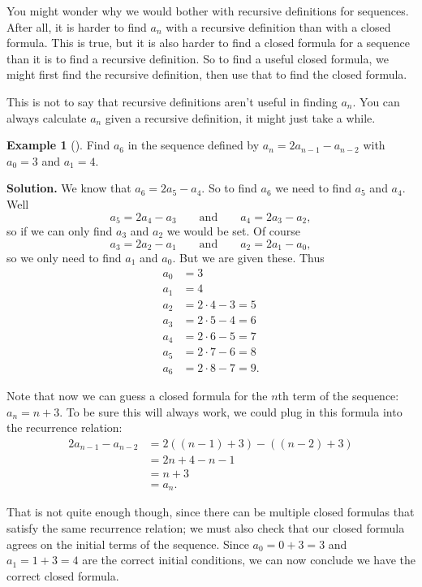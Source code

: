 \documentclass[12pt,]{book}
\theoremstyle{plain}
\theoremstyle{definition}
\theoremstyle{definition}
\newtheorem{example}[theorem]{Example}
\theoremstyle{definition}
\numberwithin{equation}{chapter}
\newcommand{\amp}{&}
\begin{document}
\hypertarget{p-51}{}%
You might wonder why we would bother with recursive definitions for sequences. After all, it is harder to find \(a_n\) with a recursive definition than with a closed formula. This is true, but it is also harder to find a closed formula for a sequence than it is to find a recursive definition. So to find a useful closed formula, we might first find the recursive definition, then use that to find the closed formula.%
\par
\hypertarget{p-52}{}%
This is not to say that recursive definitions aren't useful in finding \(a_n\). You can always calculate \(a_n\) given a recursive definition, it might just take a while.%
\begin{example}[]\label{example-3}
\hypertarget{p-53}{}%
Find \(a_6\) in the sequence defined by \(a_n = 2a_{n-1} - a_{n-2}\) with \(a_0 = 3\) and \(a_1 = 4\).%
\par\smallskip%
\noindent\textbf{Solution.}\hypertarget{solution-2}{}\quad%
\hypertarget{p-54}{}%
We know that \(a_6 = 2a_5 - a_4\). So to find \(a_6\) we need to find \(a_5\) and \(a_4\). Well%
\begin{equation*}
a_5 = 2a_4 - a_3 \qquad \text{and} \qquad a_4 = 2a_3 - a_2,
\end{equation*}
so if we can only find \(a_3\) and \(a_2\) we would be set. Of course%
\begin{equation*}
a_3 = 2a_2 - a_1 \qquad \text{and} \qquad a_2 = 2a_1 - a_0,
\end{equation*}
so we only need to find \(a_1\) and \(a_0\). But we are given these. Thus%
\begin{align*}
a_0 \amp = 3\\
a_1 \amp = 4\\
a_2 \amp = 2\cdot 4 - 3 = 5\\
a_3 \amp = 2\cdot 5 - 4 = 6\\
a_4 \amp = 2\cdot 6 - 5 = 7\\
a_5 \amp = 2\cdot 7 - 6 = 8\\
a_6 \amp = 2\cdot 8 - 7 = 9.
\end{align*}
%
\par
\hypertarget{p-55}{}%
Note that now we can guess a closed formula for the \(n\)th term of the sequence: \(a_n = n+3\). To be sure this will always work, we could plug in this formula into the recurrence relation:%
\begin{align*}
2a_{n-1} - a_{n-2} \amp = 2((n-1) + 3) - ((n-2) + 3)\\
\amp = 2n + 4 - n - 1 \\
\amp = n + 3\\
\amp = a_n.
\end{align*}
%
\par
\hypertarget{p-56}{}%
That is not quite enough though, since there can be multiple closed formulas that satisfy the same recurrence relation; we must also check that our closed formula agrees on the initial terms of the sequence.  Since \(a_0 = 0 + 3 = 3\) and \(a_1 = 1+3 = 4\) are the correct initial conditions, we can now conclude we have the correct closed formula.%
\end{example}
\end{document}
